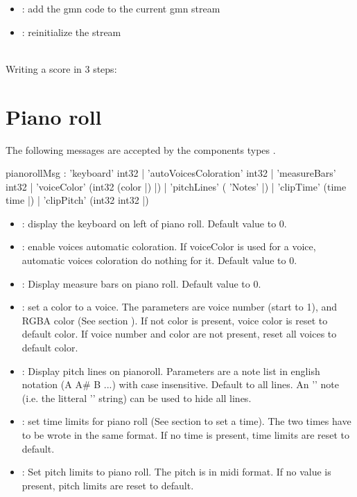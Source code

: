 \documentclass[a4paper,twoside]{report}
\newcommand{\sublevel}[1]	{\section{#1}}
\begin{document}
\begin{itemize}
\item {}: add the gmn code to the current gmn stream
\item {}: reinitialize the stream
\end{itemize}


\example \\
Writing a score in 3 steps:


\sublevel{Piano roll}
\label{pianoroll}

The following messages are accepted by the components types .


\begin{rail}
pianorollMsg :		'keyboard' int32
			| 'autoVoicesColoration' int32
			| 'measureBars' int32
			| 'voiceColor' (int32 (color |) |)
			| 'pitchLines' ( 'Notes' |)
			| 'clipTime' (time time |)
			| 'clipPitch' (int32 int32 |)
\end{rail}

\begin{itemize}
\item {}: display the keyboard on left of piano roll. Default value to 0.
\item {}: enable voices automatic coloration. If voiceColor is used for a voice, automatic voices coloration do nothing for it. Default value to 0.
\item {}: Display measure bars on piano roll. Default value to 0.
\item {}: set a color to a voice. The parameters are voice number (start to 1), and RGBA color (See section ). If not color is present, voice color is reset to default color. If voice number and color are not present, reset all voices to default color.
\item {}:  Display pitch lines on pianoroll. Parameters are a note list in english notation (A A\# B ...) with case insensitive. Default to all lines. An '' note (i.e. the litteral '' string)  can be used to hide all lines.
\item {}: set time limits for piano roll (See section  to set a time). The two times have to be wrote in the same format. If no time is present, time limits are reset to default.
\item {}:  Set pitch limits to piano roll. The pitch is in midi format. If no value is present, pitch limits are reset to default.
\end{itemize}
\end{document}

